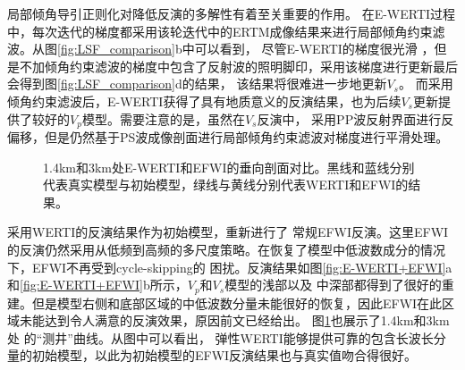 局部倾角导引正则化对降低反演的多解性有着至关重要的作用。
在E-WERTI过程中，每次迭代的梯度都采用该轮迭代中的ERTM成像结果来进行局部倾角约束滤波。从图\ref{fig:LSF_comparison}b中可以看到，
尽管E-WERTI的梯度很光滑
，但是不加倾角约束滤波的梯度中包含了反射波的照明脚印，采用该梯度进行更新最后会得到图\ref{fig:LSF_comparison}d的结果，
该结果将很难进一步地更新$V_s$。
而采用倾角约束滤波后，E-WERTI获得了具有地质意义的反演结果，也为后续$V_s$更新提供了较好的$V_p$模型。需要注意的是，虽然在$V_s$反演中，
采用PP波反射界面进行反偏移，但是仍然基于PS波成像剖面进行局部倾角约束滤波对梯度进行平滑处理。
\begin{figure}[!htb]
   \centering
   \caption{
	   1.4km和3km处E-WERTI和EFWI的垂向剖面对比。黑线和蓝线分别代表真实模型与初始模型，绿线与黄线分别代表WERTI和EFWI的结果。
   }
   \label{fig:Profiles}
\end{figure}

采用WERTI的反演结果作为初始模型，重新进行了
常规EFWI反演。这里EFWI的反演仍然采用从低频到高频的多尺度策略。在恢复了模型中低波数成分的情况下，EFWI不再受到cycle-skipping的
困扰。反演结果如图\ref{fig:E-WERTI+EFWI}a和\ref{fig:E-WERTI+EFWI}b所示，$V_p$和$V_s$模型的浅部以及
中深部都得到了很好的重建。但是模型右侧和底部区域的中低波数分量未能很好的恢复，因此EFWI在此区域未能达到令人满意的反演效果，原因前文已经给出。
图\ref{fig:Profiles}也展示了1.4km和3km处
的“测井”曲线。从图中可以看出，
弹性WERTI能够提供可靠的包含长波长分量的初始模型，以此为初始模型的EFWI反演结果也与真实值吻合得很好。

